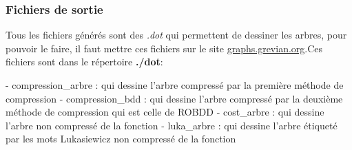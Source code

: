 \documentclass{article}
\begin{document}
\subsubsection{Fichiers de sortie}
\tabto{2cm} Tous les fichiers générés sont des \textit{.dot} qui permettent de dessiner les arbres, pour pouvoir le faire, il faut mettre ces fichiers sur le site \href{https://graphs.grevian.org/graph}{graphs.grevian.org}.Ces fichiers sont dans le répertoire \textbf{./dot}: 

\tabto{1cm} -  compression\_arbre : qui dessine l'arbre compressé par la première méthode de compression
\tabto{1cm} -  compression\_bdd : qui dessine l'arbre compressé par la deuxième méthode de compression qui est celle de ROBDD
\tabto{1cm} -  cost\_arbre : qui dessine l'arbre non compressé de la fonction 
\tabto{1cm} -  luka\_arbre : qui dessine l'arbre étiqueté par les mots Lukasiewicz non compressé de la fonction
\end{document}
